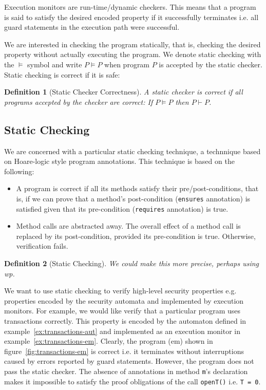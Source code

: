 \documentclass[10pt,notitlepage,twoside]{article}
\newtheorem{definition}{Definition}
\begin{document}
Execution monitors are run-time/dynamic checkers. This means that a program is said to satisfy  the desired encoded property if it successfully terminates  i.e. all guard statements in the execution path were successful.

We are interested in checking the program statically, that is, checking the desired property without actually executing the program. We denote static checking with the $\models$ symbol and write $P \models P$ when program $P$ is accepted by the static checker.
Static checking is correct if it is safe:

\begin{definition}[Static Checker Correctness]
A static checker is correct if all programs accepted by the checker are correct: If $P \models P$ then $P \vdash P$.
\end{definition}

\subsection{Static Checking}

We are concerned with a particular static checking technique, a technnique based on Hoare-logic style program annotations.
This technique is based on the following:
\begin{itemize}
\item A program is correct if all its methods satisfy their pre/post-conditions, that is, if we can prove that a method's post-condition (\texttt{ensures} annotation) is satisfied given that its pre-condition (\texttt{requires} annotation)  is true.
\item Method calls are abstracted away. The overall effect of a method call is replaced by its post-condition, provided its pre-condition is true. Otherwise, verification fails.
\end{itemize}

\begin{definition}[Static Checking]
We could make this more precise, perhaps using wp.
\end{definition}

We want to use static checking to verify high-level security  properties e.g. properties encoded by the security automata and implemented by execution monitors.
For example, we would like verify that a particular program uses transactions correctly. This property is encoded by the automaton defined in example~\ref{ex:transactions-aut} and implemented as an execution monitor in example~\ref{ex:transactions-em}.
Clearly, the program (em) shown in figure~\ref{fig:transactions-em}  is correct i.e. it terminates without interruptions caused by errors reported by guard statements.
However, the program does not pass the static checker. The absence of annotations in method \texttt{m}'s declaration makes it impossible to satisfy the proof obligations of the call \texttt{openT()}  i.e. \texttt{T = 0}. 
\end{document}
